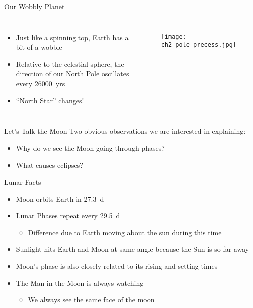 \documentclass[pdf, aspectratio=169]{beamer}
\begin{document}
\begin{frame}{Our Wobbly Planet}
  \begin{columns}
	\begin{itemize}
	  \item Just like a spinning top, Earth has a bit of a wobble
	  \item Relative to the celestial sphere, the direction of our North Pole oscillates every \SI{26000}{yrs}
	  \item ``North Star'' changes!
	\end{itemize}
	\begin{figure}[h!]
	  \centering
	  \texttt{[image: ch2\_pole\_precess.jpg]}
	\end{figure}
  \end{columns}
\end{frame}

\begin{frame}{Let's Talk the Moon}
  Two obvious observations we are interested in explaining:
  \begin{itemize}
	\item Why do we see the Moon going through phases?
	\item What causes eclipses?
  \end{itemize}
\end{frame}

\begin{frame}{Lunar Facts}
  \begin{itemize}
	\item Moon orbits Earth in \SI{27.3}{\day}
	\item Lunar Phases repeat every \SI{29.5}{\day}
	  \begin{itemize}
		\item Difference due to Earth moving about the sun during this time
	  \end{itemize}
	\item Sunlight hits Earth and Moon at same angle because the Sun is so far away
	\item Moon's phase is also closely related to its rising and setting times
	\item The Man in the Moon is always watching
	  \begin{itemize}
		\item We always see the same face of the moon
	  \end{itemize}
  \end{itemize}
\end{frame}
\end{document}
